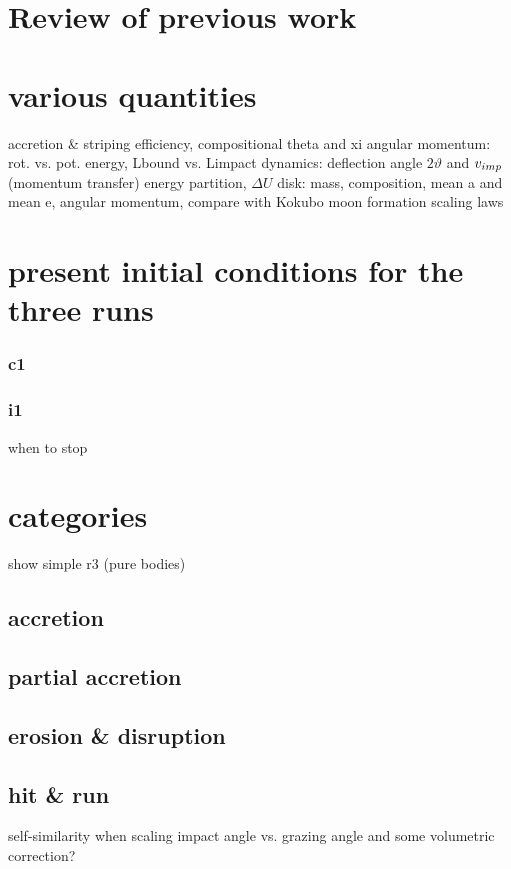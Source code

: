 \section{Review of previous work}


\section{various quantities}
accretion \& striping efficiency, compositional theta and xi
angular momentum: rot. vs. pot. energy, Lbound vs. Limpact
dynamics: deflection angle $2 \vartheta$ and $v_{imp}$ (momentum transfer)
energy partition, $\Delta U$
disk: mass, composition, mean a and mean e, angular momentum, compare with Kokubo moon formation scaling laws


\section{present initial conditions for the three runs}
\subsubsection{c1}
\subsubsection{i1}
when to stop

\section{\SSC categories}
show simple r3 (pure bodies)


\subsection{accretion}
\subsection{partial accretion}
\subsection{erosion \& disruption}
\subsection{hit \& run}


self-similarity when scaling impact angle vs. grazing angle and some volumetric correction?

